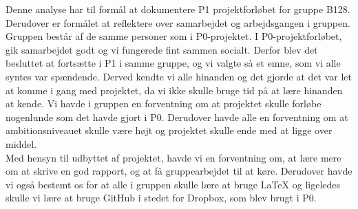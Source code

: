 Denne analyse har til formål at dokumentere P1 projektforløbet for gruppe B128. Derudover er formålet at reflektere over samarbejdet og arbejdsgangen i gruppen.
\\
Gruppen består af de samme personer som i P0-projektet. I P0-projektforløbet, gik samarbejdet godt og vi fungerede fint sammen socialt. Derfor blev det besluttet at fortsætte i P1 i samme gruppe, og vi valgte så et emne, som vi alle syntes var spændende. Derved kendte vi alle hinanden og det gjorde at det var let at komme i gang med projektet, da vi ikke skulle bruge tid på at lære hinanden at kende. Vi havde i gruppen en forventning om at projektet skulle forløbe nogenlunde som det havde gjort i P0. Derudover havde alle en forventning om at ambitionsniveauet skulle være højt og projektet skulle ende med at ligge over middel. 
\\
Med hensyn til udbyttet af projektet, havde vi en forventning om, at lære mere om at skrive en god rapport, og at få gruppearbejdet til at køre. Derudover havde vi også bestemt os for at alle i gruppen skulle lære at bruge \LaTeX{} og ligeledes skulle vi lære at bruge GitHub i stedet for Dropbox, som blev brugt i P0.  
